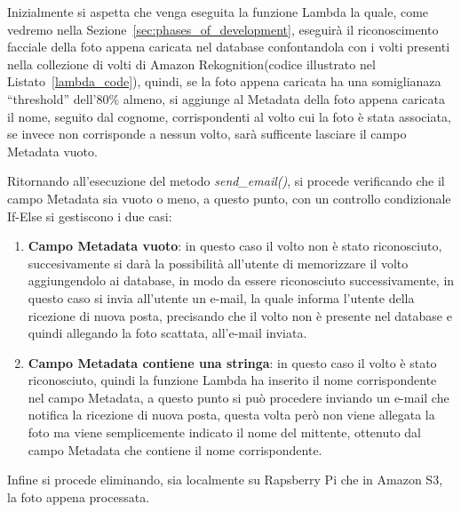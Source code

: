 Inizialmente si aspetta che venga eseguita la funzione Lambda la quale, come vedremo nella Sezione~\ref{sec:phases_of_development}, eseguirà il riconoscimento facciale
della foto appena caricata nel database confontandola con i volti presenti nella collezione di volti di Amazon Rekognition(codice illustrato nel 
Listato~\ref{lambda_code}), quindi, se la foto appena caricata ha una somiglianaza ``threshold'' dell'80\% almeno, si aggiunge al Metadata della foto appena caricata 
il nome, seguito dal cognome, corrispondenti al volto cui la foto è stata associata, se invece non corrisponde a nessun volto, sarà sufficente lasciare il campo Metadata vuoto.

Ritornando all'esecuzione del metodo \textit{send\_email()}, si procede verificando che il campo Metadata sia vuoto o meno, a questo punto, con un controllo 
condizionale If-Else si gestiscono i due casi:
\begin{enumerate}
    \item \textbf{Campo Metadata vuoto}: in questo caso il volto non è stato riconosciuto, succesivamente si darà la possibilità all'utente di memorizzare il volto
    aggiungendolo ai database, in modo da essere riconosciuto successivamente, in questo caso si invia all'utente un e-mail, la quale informa l'utente della ricezione
    di nuova posta, precisando che il volto non è presente nel database e quindi allegando la foto scattata, all'e-mail inviata.
    \item \textbf{Campo Metadata contiene una stringa}: in questo caso il volto è stato riconosciuto, quindi la funzione Lambda ha inserito il nome corrispondente nel
    campo Metadata, a questo punto si può procedere inviando un e-mail che notifica la ricezione di nuova posta, questa volta però non viene allegata la foto ma 
    viene semplicemente indicato il nome del mittente, ottenuto dal campo Metadata che contiene il nome corrispondente.
\end{enumerate}
Infine si procede eliminando, sia localmente su Rapsberry Pi che in Amazon S3, la foto appena processata.

